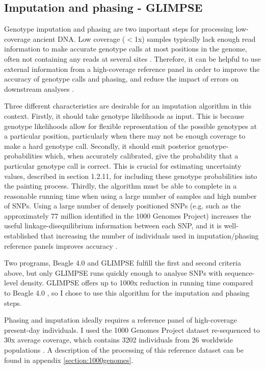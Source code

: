 \subsection{Imputation and phasing - GLIMPSE}

Genotype imputation and phasing are two important steps for processing low-coverage ancient DNA. Low coverage ($<$1x) samples typically lack enough read information to make accurate genotype calls at most positions in the genome, often not containing any reads at several sites \cite{nielsen2011genotype}. Therefore, it can be helpful to use external information from a high-coverage reference panel in order to improve the accuracy of genotype calls and phasing, and reduce the impact of errors on downstream analyses \cite{rubinacci2021efficient}. 

Three different characteristics are desirable for an imputation algorithm in this context. Firstly, it should take genotype likelihoods as input. This is because genotype likelihoods allow for flexible representation of the possible genotypes at a particular position, particularly when there may not be enough coverage to make a hard genotype call. Secondly, it should emit posterior genotype-probabilities which, when accurately calibrated, give the probability that a particular genotype call is correct. This is crucial for estimating uncertainty values, described in section  1.2.11, for including these genotype probabilities into the painting process. Thirdly, the algorithm must be able to complete in a reasonable running time when using a large number of samples and high number of SNPs. Using a large number of densely positioned SNPs (e.g. such as the approximately 77 million identified in the 1000 Genomes Project) increases the useful linkage-disequilibrium information between each SNP, and it is well-established that increasing the number of individuals used in imputation/phasing reference panels improves accuracy \cite{delaneau2018integrative, HUANG2009235, mccarthy2016reference, rubinacci2021efficient}. 

Two programs, Beagle 4.0 \cite{Browning2007} and GLIMPSE \cite{rubinacci2021efficient} fulfill the first and second criteria above, but only GLIMPSE runs quickly enough to analyse SNPs with sequence-level density. GLIMPSE offers up to 1000x reduction in running time compared to Beagle 4.0 \cite{rubinacci2021efficient}, so I chose to use this algorithm for the imputation and phasing steps.   

Phasing and imputation ideally requires a reference panel of high-coverage present-day individuals. I used the 1000 Genomes Project dataset re-sequenced to 30x average coverage, which contains 3202 individuals from 26 worldwide populations \cite{byrska2021high}. A description of the processing of this reference dataset can be found in appendix \ref{section:1000genomes}.


